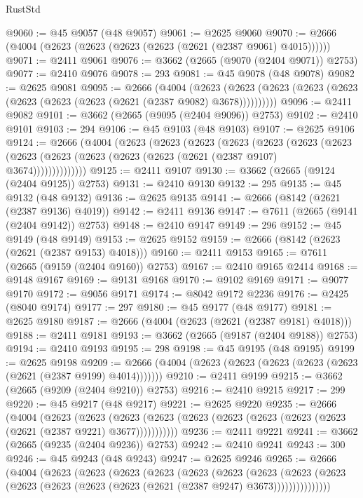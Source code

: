 \begin{lexlean}{RustStd}
\begin{coremodule}
@9060 := @45 @9057 (@48 @9057)
@9061 := @2625 @9060
@9070 := @2666 (@4004 (@2623 (@2623 (@2623 (@2623 (@2621 (@2387 @9061) @4015))))))
@9071 := @2411 @9061
@9076 := @3662 (@2665 (@9070 (@2404 @9071)) @2753)
@9077 := @2410 @9076
@9078 := 293
@9081 := @45 @9078 (@48 @9078)
@9082 := @2625 @9081
@9095 := @2666
    (@4004
      (@2623 (@2623 (@2623 (@2623 (@2623 (@2623 (@2623 (@2623 (@2621 (@2387 @9082) @3678))))))))))
@9096 := @2411 @9082
@9101 := @3662 (@2665 (@9095 (@2404 @9096)) @2753)
@9102 := @2410 @9101
@9103 := 294
@9106 := @45 @9103 (@48 @9103)
@9107 := @2625 @9106
@9124 := @2666
    (@4004
      (@2623
        (@2623
          (@2623
            (@2623
              (@2623
                (@2623
                  (@2623 (@2623 (@2623 (@2623 (@2623 (@2623 (@2621 (@2387 @9107) @3674))))))))))))))
@9125 := @2411 @9107
@9130 := @3662 (@2665 (@9124 (@2404 @9125)) @2753)
@9131 := @2410 @9130
@9132 := 295
@9135 := @45 @9132 (@48 @9132)
@9136 := @2625 @9135
@9141 := @2666 (@8142 (@2621 (@2387 @9136) @4019))
@9142 := @2411 @9136
@9147 := @7611 (@2665 (@9141 (@2404 @9142)) @2753)
@9148 := @2410 @9147
@9149 := 296
@9152 := @45 @9149 (@48 @9149)
@9153 := @2625 @9152
@9159 := @2666 (@8142 (@2623 (@2621 (@2387 @9153) @4018)))
@9160 := @2411 @9153
@9165 := @7611 (@2665 (@9159 (@2404 @9160)) @2753)
@9167 := @2410 @9165 @2414
@9168 := @9148 @9167
@9169 := @9131 @9168
@9170 := @9102 @9169
@9171 := @9077 @9170
@9172 := @9056 @9171
@9174 := @8042 @9172 @2236
@9176 := @2425 (@8040 @9174)
@9177 := 297
@9180 := @45 @9177 (@48 @9177)
@9181 := @2625 @9180
@9187 := @2666 (@4004 (@2623 (@2621 (@2387 @9181) @4018)))
@9188 := @2411 @9181
@9193 := @3662 (@2665 (@9187 (@2404 @9188)) @2753)
@9194 := @2410 @9193
@9195 := 298
@9198 := @45 @9195 (@48 @9195)
@9199 := @2625 @9198
@9209 := @2666 (@4004 (@2623 (@2623 (@2623 (@2623 (@2623 (@2621 (@2387 @9199) @4014)))))))
@9210 := @2411 @9199
@9215 := @3662 (@2665 (@9209 (@2404 @9210)) @2753)
@9216 := @2410 @9215
@9217 := 299
@9220 := @45 @9217 (@48 @9217)
@9221 := @2625 @9220
@9235 := @2666
    (@4004
      (@2623
        (@2623
          (@2623 (@2623 (@2623 (@2623 (@2623 (@2623 (@2623 (@2621 (@2387 @9221) @3677)))))))))))
@9236 := @2411 @9221
@9241 := @3662 (@2665 (@9235 (@2404 @9236)) @2753)
@9242 := @2410 @9241
@9243 := 300
@9246 := @45 @9243 (@48 @9243)
@9247 := @2625 @9246
@9265 := @2666
    (@4004
      (@2623
        (@2623
          (@2623
            (@2623
              (@2623
                (@2623
                  (@2623
                    (@2623
                      (@2623 (@2623 (@2623 (@2623 (@2623 (@2621 (@2387 @9247) @3673)))))))))))))))

\end{coremodule}
\end{lexlean}
